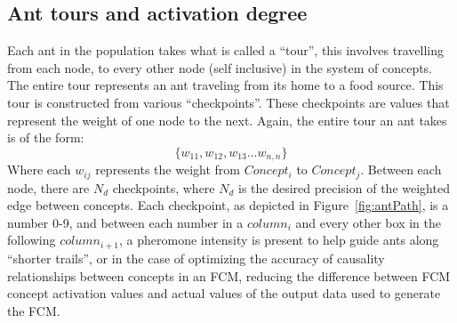 \documentclass{umm-senior-sem}
\begin{document}
\subsection{Ant tours and activation degree}
\label{sec:activation}
Each ant in the population takes what is called a ``tour'', this involves travelling from each node, to every other node (self inclusive) in the system of concepts. The entire tour represents an ant traveling from its home to a food source. This tour is constructed from various ``checkpoints''. These checkpoints are values that represent the weight of one node to the next. Again, the entire tour an ant takes is of the form: 
\begin{equation}
 \big\{w_{11}, w_{12}, w_{13} ... w_{n,n}\big\} 
\end{equation}
Where each $w_{ij}$ represents the weight from $Concept_i$ to $Concept_j$.
Between each node, there are $N_d$ checkpoints, where $N_d$ is the desired precision of the weighted edge between concepts. Each checkpoint, as depicted in Figure~\ref{fig:antPath}, is a number 0-9, and between each number in a $column_i$ and every other box in the following $column_{i+1}$, a pheromone intensity is present to help guide ants along ``shorter trails'', or in the case of optimizing the accuracy of causality relationships between concepts in an FCM, reducing the difference between FCM concept activation values and actual values of the output data used to generate the FCM. 
\end{document}
